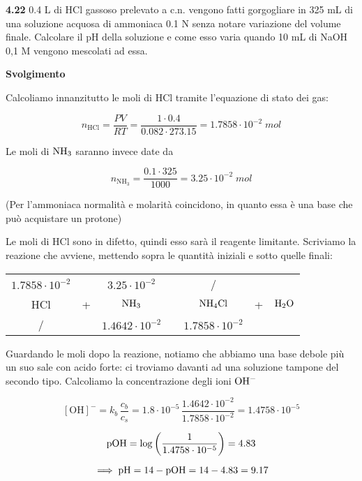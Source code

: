 \vspace{0.2cm}\textbf{4.22} 0.4 L di HCl gassoso prelevato a c.n. vengono fatti gorgogliare in 325 mL di una soluzione acquosa di ammoniaca 0.1 N senza notare variazione del volume finale. Calcolare il pH della soluzione e come esso varia quando 10 mL di NaOH 0,1 M vengono mescolati ad essa.

\vspace{0.2cm}\large\textbf{Svolgimento}\normalsize

\vspace{0.2cm} Calcoliamo innanzitutto le moli di HCl tramite l'equazione di stato dei gas:

$$n_{\text{HCl}}=\frac{PV}{RT}=\frac{1 \cdot 0.4}{0.082 \cdot 273.15}=1.7858 \cdot 10^{-2}\;mol$$

Le moli di $\rm NH_3$ saranno invece date da

$$n_{\text{NH}_3}=\frac{0.1 \cdot 325}{1000}=3.25 \cdot 10^{-2}\;mol$$

(Per l'ammoniaca normalità e molarità coincidono, in quanto essa è una base che può acquistare un protone)

Le moli di HCl sono in difetto, quindi esso sarà il reagente limitante. Scriviamo la reazione che avviene, mettendo sopra le quantità iniziali e sotto quelle finali:

\begin{center}
    \begin{tabular}{ccccccc}
        $1.7858 \cdot 10^{-2}$ &  & $3.25 \cdot 10^{-2}$ & & / & &\\
        HCl & + & $\rm NH_3$ & \ce{->} & $\rm NH_4Cl$ & + & $\rm H_2O$\\
        / &  &  $1.4642 \cdot 10^{-2}$ & & $1.7858 \cdot 10^{-2}$ & &\\
    \end{tabular}
\end{center}

Guardando le moli dopo la reazione, notiamo che abbiamo una base debole più un suo sale con acido forte: ci troviamo davanti ad una soluzione tampone del secondo tipo. Calcoliamo la concentrazione degli ioni $\rm OH^-$

$$[\text{OH}]^-=k_b\,\frac{c_b}{c_s}
=1.8 \cdot 10^{-5}\,\frac{1.4642 \cdot 10^{-2}}{1.7858 \cdot 10^{-2}}
=1.4758 \cdot 10^{-5}$$

$$\rm pOH=\log \left( \frac{1}{1.4758 \cdot 10^{-5}} \right)=4.83$$

$$\implies \rm pH=14-pOH=14-4.83=9.17$$

